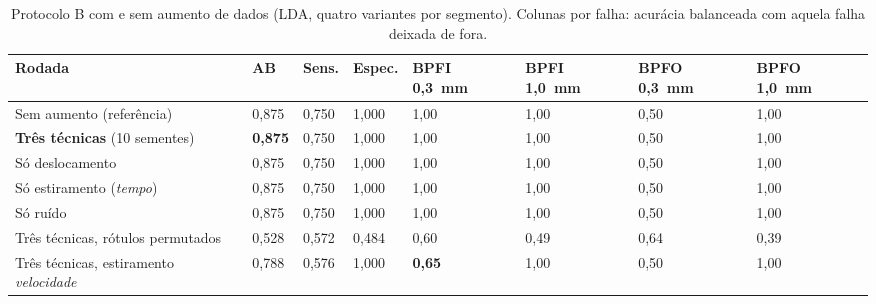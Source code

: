 \begin{table}[H]
\centering
\caption{Protocolo B com e sem aumento de dados (LDA, quatro variantes por segmento). Colunas por falha: acurácia balanceada com aquela falha deixada de fora.}
\label{tab:res-aumento}
\small
\begin{tabularx}{\textwidth}{X C{1.1cm} C{1.1cm} C{1.1cm} C{1.3cm} C{1.3cm} C{1.3cm} C{1.3cm}}
\toprule
\textbf{Rodada} & \textbf{AB} & \textbf{Sens.} & \textbf{Espec.} & \textbf{BPFI 0,3~mm} & \textbf{BPFI 1,0~mm} & \textbf{BPFO 0,3~mm} & \textbf{BPFO 1,0~mm} \\
\midrule
Sem aumento (referência) & 0,875 & 0,750 & 1,000 & 1,00 & 1,00 & 0,50 & 1,00 \\
\textbf{Três técnicas} (10 sementes) & \textbf{0,875} & 0,750 & 1,000 & 1,00 & 1,00 & 0,50 & 1,00 \\
Só deslocamento & 0,875 & 0,750 & 1,000 & 1,00 & 1,00 & 0,50 & 1,00 \\
Só estiramento (\emph{tempo}) & 0,875 & 0,750 & 1,000 & 1,00 & 1,00 & 0,50 & 1,00 \\
Só ruído & 0,875 & 0,750 & 1,000 & 1,00 & 1,00 & 0,50 & 1,00 \\
Três técnicas, rótulos permutados & 0,528 & 0,572 & 0,484 & 0,60 & 0,49 & 0,64 & 0,39 \\
Três técnicas, estiramento \emph{velocidade} & 0,788 & 0,576 & 1,000 & \textbf{0,65} & 1,00 & 0,50 & 1,00 \\
\bottomrule
\end{tabularx}
\end{table}
